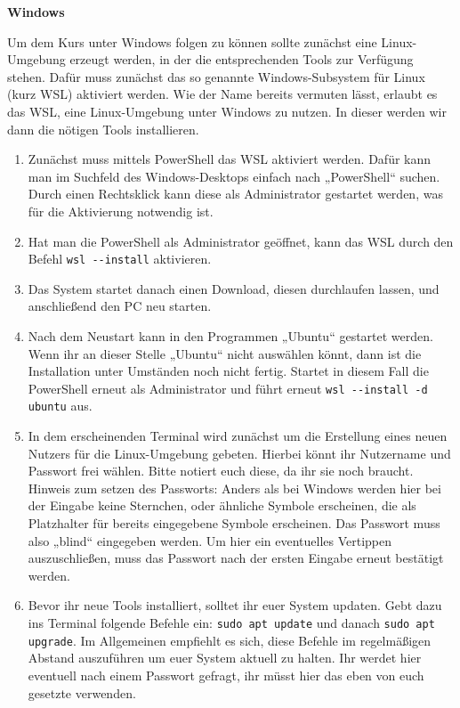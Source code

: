 \textbf{Windows}

\pagestyle{empty}
Um dem Kurs unter Windows folgen zu können sollte zunächst eine Linux-Umgebung erzeugt werden, in der die entsprechenden Tools zur Verfügung stehen. Dafür muss zunächst das so genannte Windows-Subsystem für Linux (kurz WSL) aktiviert werden.
Wie der Name bereits vermuten lässt, erlaubt es das WSL, eine Linux-Umgebung unter Windows zu nutzen.
In dieser werden wir dann die nötigen Tools installieren.
\begin{enumerate}
	\item Zunächst muss mittels PowerShell das WSL aktiviert werden. Dafür kann man im Suchfeld des Windows-Desktops einfach nach „PowerShell“ suchen.
	Durch einen Rechtsklick kann diese als Administrator gestartet werden, was für die Aktivierung notwendig ist.
	\item Hat man die PowerShell als Administrator geöffnet, kann das WSL durch den Befehl \texttt{wsl -{}-install} aktivieren.
	\item Das System startet danach einen Download, diesen durchlaufen lassen, und anschließend den PC neu starten.
	\item Nach dem Neustart kann in den Programmen „Ubuntu“ gestartet werden. 
		Wenn ihr an dieser Stelle „Ubuntu“ nicht auswählen könnt, dann ist die Installation unter Umständen noch nicht fertig.
		Startet in diesem Fall die PowerShell erneut als Administrator und führt erneut \texttt{wsl -{}-install -d ubuntu} aus.
	\item In dem erscheinenden Terminal wird zunächst um die Erstellung eines neuen Nutzers für die Linux-Umgebung gebeten. 
		Hierbei könnt ihr Nutzername und Passwort frei wählen. Bitte notiert euch diese, da ihr sie noch braucht.\\
		Hinweis zum setzen des Passworts: Anders als bei Windows werden hier bei der Eingabe keine Sternchen, oder ähnliche Symbole erscheinen, die als Platzhalter für bereits eingegebene Symbole erscheinen. 
		Das Passwort muss also „blind“ eingegeben werden. Um hier ein eventuelles Vertippen auszuschließen, muss das Passwort nach der ersten Eingabe erneut bestätigt werden.
	\item Bevor ihr neue Tools installiert, solltet ihr euer System updaten. Gebt dazu ins Terminal folgende Befehle ein: \texttt{sudo apt update} und danach \texttt{sudo apt upgrade}. Im Allgemeinen empfiehlt es sich, diese Befehle im regelmäßigen Abstand auszuführen um euer System aktuell zu halten. Ihr werdet hier eventuell nach einem Passwort gefragt, ihr müsst hier das eben von euch gesetzte verwenden.

\end{enumerate}
